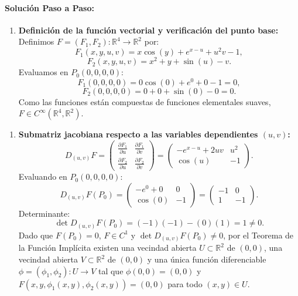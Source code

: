 \documentclass[11pt,a4paper]{article}
\begin{document}
\paragraph{Solución Paso a Paso:}\par
\begin{enumerate}[label=\textbf{\arabic*.}]
\item \textbf{Definición de la función vectorial y verificación del punto base:}
Definimos $F = (F_1, F_2): \mathbb{R}^4 \to \mathbb{R}^2$ por:
\begin{equation*}
F_1(x,y,u,v) = x\cos(y) + e^{x-u} + u^2 v - 1,
\end{equation*}
\begin{equation*}
F_2(x,y,u,v) = x^2 + y + \sin(u) - v.
\end{equation*}
Evaluamos en $P_0(0,0,0,0)$:
\begin{equation*}
F_1(0,0,0,0) = 0\cos(0) + e^0 + 0 - 1 = 0,
\end{equation*}
\begin{equation*}
F_2(0,0,0,0) = 0 + 0 + \sin(0) - 0 = 0.
\end{equation*}
Como las funciones están compuestas de funciones elementales suaves, $F \in C^\infty(\mathbb{R}^4, \mathbb{R}^2)$.
\end{enumerate}

\begin{enumerate}[label=\textbf{\arabic*.}]
\item \textbf{Submatriz jacobiana respecto a las variables dependientes $(u,v)$:}
\begin{equation*}
D_{(u,v)}F = \begin{pmatrix} \frac{\partial F_1}{\partial u} & \frac{\partial F_1}{\partial v} \\ \frac{\partial F_2}{\partial u} & \frac{\partial F_2}{\partial v} \end{pmatrix} = \begin{pmatrix} -e^{x-u} + 2uv & u^2 \\ \cos(u) & -1 \end{pmatrix}.
\end{equation*}
Evaluando en $P_0(0,0,0,0)$:
\begin{equation*}
D_{(u,v)}F(P_0) = \begin{pmatrix} -e^0 + 0 & 0 \\ \cos(0) & -1 \end{pmatrix} = \begin{pmatrix} -1 & 0 \\ 1 & -1 \end{pmatrix}.
\end{equation*}
Determinante:
\begin{equation*}
\det D_{(u,v)}F(P_0) = (-1)(-1) - (0)(1) = 1 \neq 0.
\end{equation*}
Dado que $F(P_0) = 0$, $F \in C^1$ y $\det D_{(u,v)}F(P_0) \neq 0$, por el Teorema de la Función Implícita existen una vecindad abierta $U \subset \mathbb{R}^2$ de $(0,0)$, una vecindad abierta $V \subset \mathbb{R}^2$ de $(0,0)$ y una única función diferenciable $\phi = (\phi_1, \phi_2): U \to V$ tal que $\phi(0,0) = (0,0)$ y $F(x, y, \phi_1(x,y), \phi_2(x,y)) = (0,0)$ para todo $(x,y) \in U$.
\end{enumerate}
\end{document}
